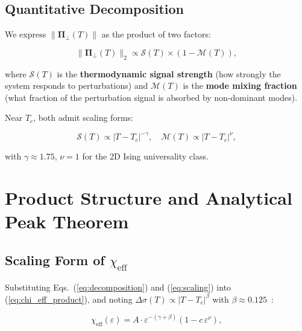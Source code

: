 \documentclass[aps,prl,twocolumn,superscriptaddress,byrevtex]{article}
\begin{document}
\subsection{Quantitative Decomposition}

We express $\|\boldsymbol{\Pi}_\perp(T)\|$ as the product of two factors:

\begin{equation}
\|\boldsymbol{\Pi}_\perp(T)\|_2 \propto \mathcal{S}(T) \times (1 - \mathcal{M}(T)),
\label{eq:decomposition}
\end{equation}

where $\mathcal{S}(T)$ is the \textbf{thermodynamic signal strength} (how strongly the system responds to perturbations) and $\mathcal{M}(T)$ is the \textbf{mode mixing fraction} (what fraction of the perturbation signal is absorbed by non-dominant modes).

Near $T_c$, both admit scaling forms:

\begin{equation}
\mathcal{S}(T) \propto |T - T_c|^{-\gamma}, \quad
\mathcal{M}(T) \propto |T - T_c|^{\nu},
\label{eq:scaling}
\end{equation}

with $\gamma \approx 1.75$, $\nu = 1$ for the 2D Ising universality class.

\section{Product Structure and Analytical Peak Theorem}

\subsection{Scaling Form of \texorpdfstring{$\chi_{\text{eff}}$}{χ\_eff}}

Substituting Eqs.~(\ref{eq:decomposition}) and (\ref{eq:scaling}) into (\ref{eq:chi_eff_product}), and noting $\Delta\sigma(T) \propto |T - T_c|^{\beta}$ with $\beta \approx 0.125$~\cite{onsager1944}:

\begin{equation}
\boxed{\chi_{\text{eff}}(\varepsilon) = A \cdot \varepsilon^{-(\gamma+\beta)} (1 - c\,\varepsilon^{\nu}),}
\label{eq:scaling_form}
\end{equation}
\end{document}
